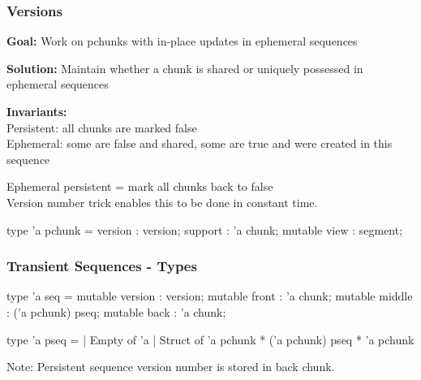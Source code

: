 \begin{frame}[fragile]
\frametitle{Versions}

\textbf{Goal:} Work on pchunks with in-place updates in ephemeral sequences

\smallskip

\textbf{Solution:} Maintain whether a chunk is shared or uniquely possessed in ephemeral sequences

\medskip

\textbf{Invariants:} \\
Persistent: all chunks are marked false\\
Ephemeral: some are false and shared, some are true and were created in this sequence

\smallskip

Ephemeral \textrightarrow persistent = mark all chunks back to false\\

Version number trick enables this to be done in constant time.\\

\begin{caml}
  type 'a pchunk = {
  	version : version;
   support : 'a chunk;
   mutable view : segment; }
\end{caml}

\bigskip

\end{frame}

\begin{frame}[fragile]
\frametitle{Transient Sequences - Types}

\begin{caml}
type 'a seq = {
  mutable version : version;
  mutable front : 'a chunk;
  mutable middle : ('a pchunk) pseq;
  mutable back : 'a chunk;
}
\end{caml}

\begin{caml}
type 'a pseq =
| Empty of 'a
| Struct of 'a pchunk * ('a pchunk) pseq * 'a pchunk
\end{caml}

\medskip

Note: Persistent sequence version number is stored in back chunk.

\end{frame}

